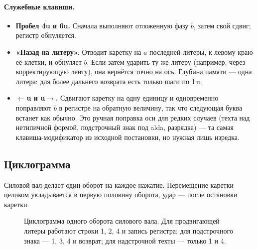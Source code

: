\documentclass[11pt,a4paper]{article}
\begin{document}
\paragraph{Служебные клавиши.}
\begin{itemize}
  \item \textbf{Пробел 4u и 6u.} Сначала выполняют отложенную фазу $b$, затем свой сдвиг; регистр обнуляется.
  \item \textbf{«Назад на литеру».} Отводит каретку на $a$ последней литеры, к левому краю её клетки, и обнуляет $b$. Если затем ударить ту же литеру (например, через корректирующую ленту), она вернётся точно на ось. Глубина памяти — одна литера: для более дальнего возврата есть только шаги по 1\,u.
  \item \textbf{$\leftarrow$u и u$\rightarrow$.} Сдвигают каретку на одну единицу и одновременно поправляют $b$ в регистре на обратную величину, так что следующая буква встанет как обычно. Это ручная поправка оси для редких случаев (техта над нетипичной формой, подстрочный знак под alda, разрядка) — та самая клавиша-модификатор из исходной постановки, но нужная лишь изредка.
\end{itemize}

\subsection{Циклограмма}

Силовой вал делает один оборот на каждое нажатие. Перемещение каретки целиком укладывается в первую половину оборота, удар — после остановки каретки.

\begin{figure}[h]
\centering
{}
\caption{Циклограмма одного оборота силового вала. Для продвигающей литеры работают строки 1, 2, 4 и запись регистра; для подстрочного знака — 1, 3, 4 и возврат; для надстрочной техты — только 1 и 4.}
\label{fig:timing}
\end{figure}
\end{document}
